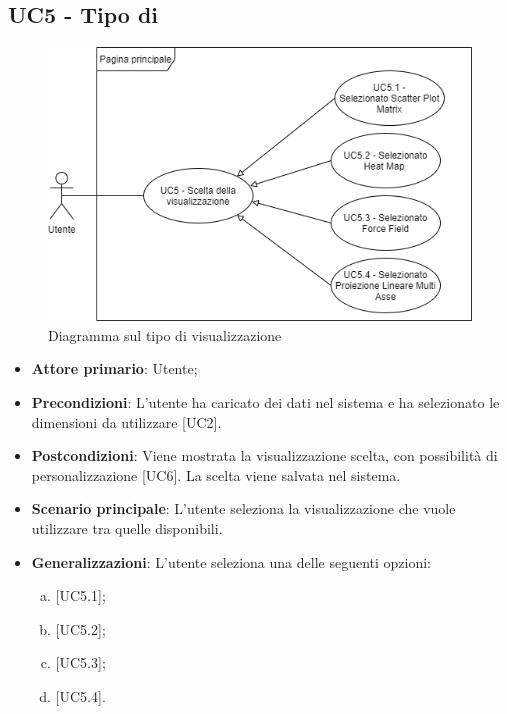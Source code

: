 \subsection{UC5 - Tipo di }
\begin{figure}[!htb]
\includegraphics[width=\linewidth]{Section/Images/UC5.png}
\centering
\caption{Diagramma sul tipo di visualizzazione}
\end{figure}

\begin{itemize}
	\item \textbf{Attore primario}: Utente;
	\item \textbf{Precondizioni}: L'utente ha caricato dei dati nel sistema e ha selezionato le dimensioni da utilizzare [UC2].
	\item \textbf{Postcondizioni}: Viene mostrata la visualizzazione scelta, con possibilità di personalizzazione [UC6]. La scelta viene salvata nel sistema.
	\item \textbf{Scenario principale}: L'utente seleziona la visualizzazione che vuole utilizzare tra quelle disponibili.
	\item \textbf{Generalizzazioni}: L'utente seleziona una delle seguenti opzioni:
		\begin{enumerate}[(a)]
			\item {} [UC5.1];
			\item {} [UC5.2];
			\item {} [UC5.3];
			\item {} [UC5.4].
		\end{enumerate}

\end{itemize}